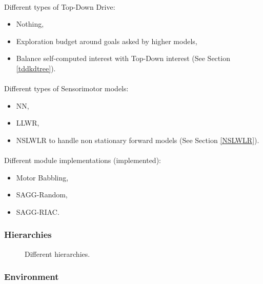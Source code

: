 \documentclass[12pt]{article}
\begin{document}
			\paragraph{}
			Different types of Top-Down Drive:
			\begin{itemize}
				\item Nothing,
				\item Exploration budget around goals asked by higher models,
				\item Balance self-computed interest with Top-Down interest (See Section \ref{tddkdtree}).
			\end{itemize}
			
			
			\paragraph{}
			Different types of Sensorimotor models:
			\begin{itemize}
				\item NN,
				\item LLWR,
				\item NSLWLR to handle non stationary forward models (See Section \ref{NSLWLR}).
			\end{itemize}
			
			\paragraph{}
			Different module implementations (implemented):
			\begin{itemize}
				\item Motor Babbling,
				\item SAGG-Random,
				\item SAGG-RIAC.
			\end{itemize}
		
		
		\subsubsection{Hierarchies}
		
		

			\begin{figure}[H] 
				\subfloat[]{}
				\subfloat[]{}
				\subfloat[]{}
				\subfloat[]{}
				\caption{Different hierarchies.}
				\label{H}					
			\end{figure}
		
		
		\subsubsection{Environment}
		
\end{document}
